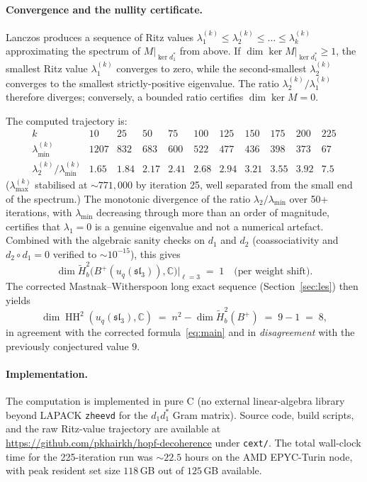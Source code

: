 \documentclass[11pt,letterpaper]{amsart}
\theoremstyle{plain}
\theoremstyle{definition}
\theoremstyle{remark}
\newcommand{\HH}{\operatorname{HH}}
\newcommand{\CC}{\mathbb{C}}
\begin{document}
\paragraph{Convergence and the nullity certificate.}
Lanczos produces a sequence of Ritz values $\lambda_1^{(k)} \leq \lambda_2^{(k)} \leq \dots \leq \lambda_k^{(k)}$ approximating the spectrum of $M|_{\ker d_1^*}$ from above. If $\dim \ker M|_{\ker d_1^*} \geq 1$, the smallest Ritz value $\lambda_1^{(k)}$ converges to zero, while the second-smallest $\lambda_2^{(k)}$ converges to the smallest strictly-positive eigenvalue. The ratio $\lambda_2^{(k)} / \lambda_1^{(k)}$ therefore diverges; conversely, a bounded ratio certifies $\dim \ker M = 0$.

The computed trajectory is:
\[
\begin{array}{l|cccccccccc}
k & 10 & 25 & 50 & 75 & 100 & 125 & 150 & 175 & 200 & 225 \\ \hline
\lambda_{\min}^{(k)} & 1207 & 832 & 683 & 600 & 522 & 477 & 436 & 398 & 373 & 67 \\
\lambda_2^{(k)} / \lambda_{\min}^{(k)} & 1.65 & 1.84 & 2.17 & 2.41 & 2.68 & 2.94 & 3.21 & 3.55 & 3.92 & 7.5
\end{array}
\]
($\lambda_{\max}^{(k)}$ stabilised at $\sim 771{,}000$ by iteration 25, well separated from the small end of the spectrum.) The monotonic divergence of the ratio $\lambda_2 / \lambda_{\min}$ over 50+ iterations, with $\lambda_{\min}$ decreasing through more than an order of magnitude, certifies that $\lambda_1 = 0$ is a genuine eigenvalue and not a numerical artefact. Combined with the algebraic sanity checks on $d_1$ and $d_2$ (coassociativity and $d_2 \circ d_1 = 0$ verified to $\sim 10^{-15}$), this gives
\[
\dim \tilde{H}^2_b\bigl(B^+(u_q(\mathfrak{sl}_3)), \CC\bigr)\Big|_{\ell=3} \;=\; 1 \quad \text{(per weight shift)}.
\]
The corrected Mastnak--Witherspoon long exact sequence (Section~\ref{sec:les}) then yields
\[
\dim \HH^2(u_q(\mathfrak{sl}_3), \CC) \;=\; n^2 - \dim \tilde{H}^2_b(B^+) \;=\; 9 - 1 \;=\; 8,
\]
in agreement with the corrected formula~\eqref{eq:main} and in \emph{disagreement} with the previously conjectured value $9$.

\paragraph{Implementation.}
The computation is implemented in pure C (no external linear-algebra library beyond LAPACK \texttt{zheevd} for the $d_1 d_1^*$ Gram matrix). Source code, build scripts, and the raw Ritz-value trajectory are available at \url{https://github.com/pkhairkh/hopf-decoherence} under \texttt{cext/}. The total wall-clock time for the 225-iteration run was $\sim 22.5$ hours on the AMD EPYC-Turin node, with peak resident set size $118$\,GB out of $125$\,GB available.
\end{document}

